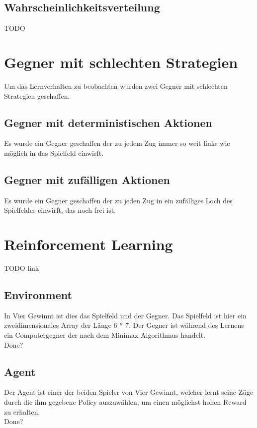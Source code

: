 \subsection{Wahrscheinlichkeitsverteilung}
\colorbox{red!30}{TODO}

\section{Gegner mit schlechten Strategien}
Um das Lernverhalten zu beobachten wurden zwei Gegner mit schlechten Strategien geschaffen.

\subsection{Gegner mit deterministischen Aktionen}
Es wurde ein Gegner geschaffen der zu jedem Zug immer so weit links wie möglich in das Spielfeld einwirft. 

\subsection{Gegner mit zufälligen Aktionen}
Es wurde ein Gegner geschaffen der zu jeden Zug in ein zufälliges Loch des Spielfeldes einwirft, das noch frei ist.


\section{Reinforcement Learning}

\colorbox{red!30}{TODO link}

\subsection{Environment}
In Vier Gewinnt ist dies das Spielfeld und der Gegner. Das Spielfeld ist hier ein zweidimensionales Array der Länge 6 * 7. Der Gegner ist während des Lernens ein Computergegner der nach dem Minimax Algorithmus handelt. \\
\colorbox{red!30}{Done?}

\subsection{Agent}
Der Agent ist einer der beiden Spieler von Vier Gewinnt, welcher lernt seine Züge durch die ihm gegebene Policy auszuwählen, um einen möglichst hohen Reward zu erhalten.\\
\colorbox{red!30}{Done?} 

